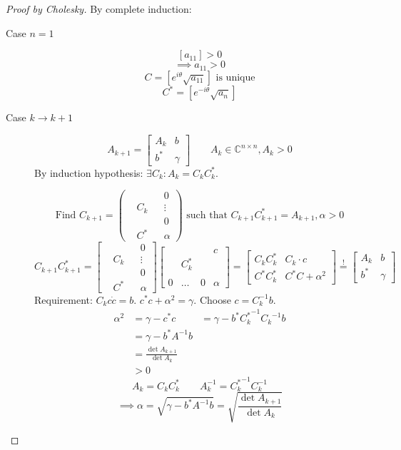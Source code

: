 \documentclass{article}
\begin{document}
\begin{proof}[Proof by Cholesky]
  By complete induction:
  \begin{description}
    \item[Case $n = 1$]
      \[ [a_{11}] > 0 \]
      \[ \implies a_{11} > 0 \]
      \[ C = [ e^{i\theta} \sqrt{a_{11}}] \text{ is unique} \]
      \[ C^* = [e^{-i\theta} \sqrt{a_n}] \]
    \item[Case $k \to k+1$]
      \[ A_{k+1} = \begin{bmatrix} A_k & b \\ b^* & \gamma \end{bmatrix} \qquad A_k \in \mathbb C^{n \times n}, A_k > 0 \]
      By induction hypothesis:
      $\exists C_k: A_k = C_k C_k^*$.

      \[ \text{Find } C_{k+1} = \begin{pmatrix} &  & & 0 \\ & C_k & & \vdots \\ & & & 0 \\ & C^* & & \alpha \end{pmatrix} \text{ such that } C_{k+1} C_{k+1}^* = A_{k+1}, \alpha > 0 \]
      \[ C_{k+1} C_{k+1}^* = \begin{bmatrix} &  & & 0 \\ & C_k & & \vdots \\ & & & 0 \\ & C^* & & \alpha \end{bmatrix} \begin{bmatrix} &  & & c \\ & C_k^* & & \\ & & & \\ 0 & \dots & 0 & \alpha \end{bmatrix} = \left[\begin{array}{c|c} C_k C_k^* & C_k \cdot c \\ C^* C_k^* & C^* C + \alpha^2 \end{array}\right]  \overset!= \begin{bmatrix} A_k & b \\ b^* & \gamma \end{bmatrix} \]
      Requirement: $C_k c\dot c = b$. $c^* c + \alpha^2 = \gamma$.
      Choose $c = C_k^{-1} b$.
      \begin{align*}
        \alpha^2 &= \gamma - c^* c
          &= \gamma - b^* {C_k^*}^{-1} {C_k}^{-1} b \\
          &= \gamma - b^* A^{-1} b \\
          &= \frac{\det{A_{k+1}}}{\det{A_k}} \\
          &> 0
      \end{align*}
      \[ A_k = C_k C^*_k \qquad A_k^{-1} = {C_k^*}^{-1} C_k^{-1} \]
      \[ \implies \alpha = \sqrt{\gamma - b^* A^{-1} b} = \sqrt{\frac{\det{A_{k+1}}}{\det{A_k}}} \]
  \end{description}
\end{proof}
\end{document}
